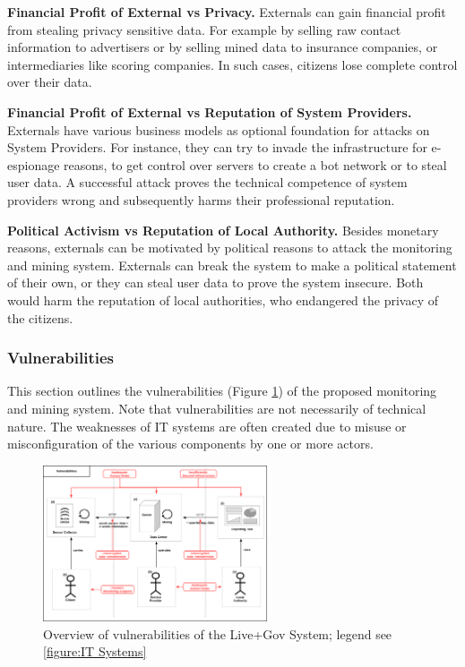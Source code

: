 \documentclass[runningheads,a4paper]{llncs}
\begin{document}
\textbf{Financial Profit of External vs Privacy.}
Externals can gain financial profit from stealing privacy sensitive data.
For example by selling raw contact information to advertisers or by selling mined data to insurance companies, or intermediaries like scoring companies. In such cases, citizens lose complete control over their data.


\textbf{Financial Profit of External vs Reputation of System Providers.}
Externals have various business models as optional foundation for attacks on System Providers.
For instance, they can try to invade the infrastructure for e-espionage reasons, to get control over servers to create a bot network or to steal user data. A successful attack proves the technical competence of system providers wrong and subsequently harms their professional reputation.


\textbf{Political Activism vs Reputation of Local Authority.}
Besides monetary reasons, externals can be motivated by political reasons to attack the monitoring and mining system.
Externals can break the system to make a political statement of their own,
or they can steal user data to prove the system insecure.
Both would harm the reputation of local authorities, who endangered the privacy of the citizens.


\subsubsection{Vulnerabilities}
\label{subsubsection:Vulnerabilities}
This section outlines the vulnerabilities (Figure \ref{figure:Live+Gov Vulnerabilities}) of the proposed monitoring and mining system.
Note that vulnerabilities are not necessarily of technical nature.
The weaknesses of IT systems are often created due to misuse or misconfiguration of the various components by one or more actors.

\begin{figure}
\centering
\includegraphics[width=0.6\textwidth]{diagrams/png/vulnerabilities.png}

\caption{Overview of vulnerabilities of the Live+Gov System; legend see \ref{figure:IT Systems} }
\label{figure:Live+Gov Vulnerabilities}
\end{figure}
\end{document}
